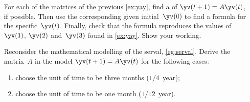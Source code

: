 \begin{exercise} \label{ex:} 
For each of the matrices of the previous \autoref{ex:yay}, find a  of \(\yv(t+1)=A\yv(t)\), if possible.
Then use the corresponding given initial~\(\yv(0)\) to find a formula for the specific~\(\yv(t)\).
Finally, check that the formula reproduces the values of \(\yv(1)\), \(\yv(2)\) and~\(\yv(3)\) found in \autoref{ex:yay}.
Show your working.
\end{exercise}





\begin{exercise} \label{ex:} 
Reconsider the mathematical modelling of the serval, \autoref{eg:serval}.
Derive the matrix~\(A\) in the model \(\yv(t+1)=A\yv(t)\) for the following cases:
\begin{enumerate}
\item choose the unit of time to be three months (\(1/4\)~year);

\item choose the unit of time to be one month  (\(1/12\)~year).

\end{enumerate}
\end{exercise}







